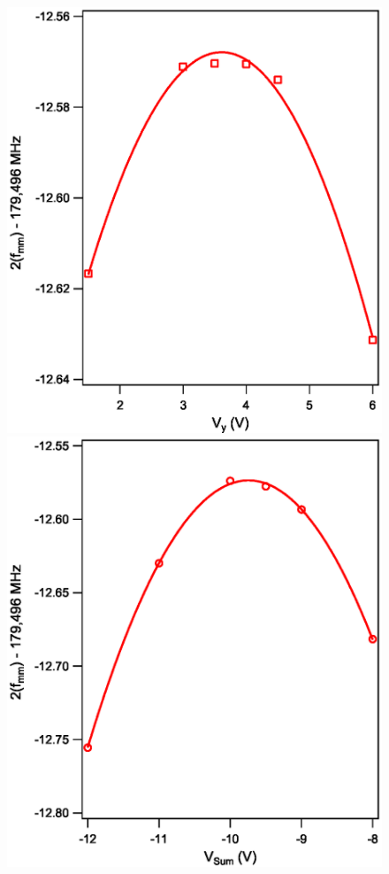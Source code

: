 \documentclass[landscape]{sciposter}
\begin{document}
\begin{multicols}{4}
\begin{figure}
\begin{center}
\includegraphics[scale = 0.8]{33d52_Vy.eps}
\includegraphics[scale = 0.8]{33d52_VSum.eps}
\end{center}
\end{figure}


\end{multicols}
\end{document}
